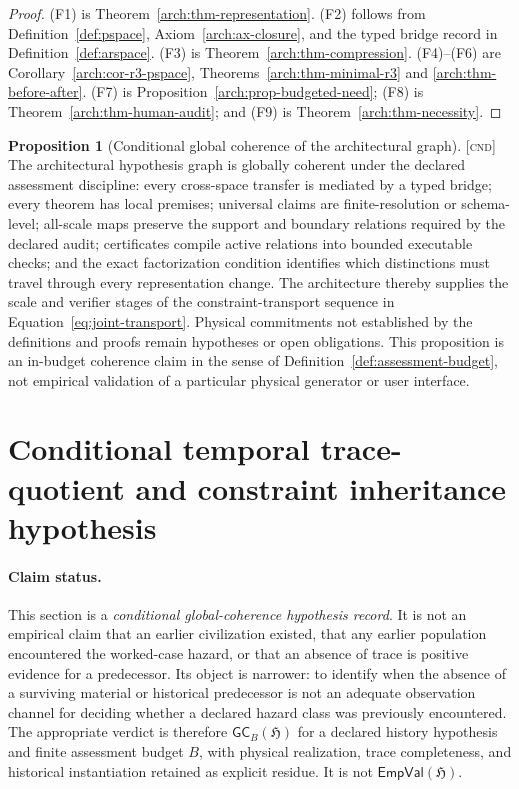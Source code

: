 \documentclass[11pt]{article}
\newcommand{\Cnd}{\textsc{[cnd]}}
\theoremstyle{definition}
\newtheorem{sproposition}{Proposition}
\begin{document}
\begin{proof}
(F1) is Theorem~\ref{arch:thm-representation}. (F2) follows from
Definition~\ref{def:pspace}, Axiom~\ref{arch:ax-closure}, and the typed bridge
record in Definition~\ref{def:arspace}. (F3) is Theorem~\ref{arch:thm-compression}.
(F4)--(F6) are Corollary~\ref{arch:cor-r3-pspace},
Theorems~\ref{arch:thm-minimal-r3} and \ref{arch:thm-before-after}. (F7) is
Proposition~\ref{arch:prop-budgeted-need}; (F8) is
Theorem~\ref{arch:thm-human-audit}; and (F9) is
Theorem~\ref{arch:thm-necessity}.
\end{proof}

\begin{sproposition}[Conditional global coherence of the architectural graph]
\label{arch:prop-global-coherence}
\Cnd{} The architectural hypothesis graph is globally coherent under the declared
assessment discipline: every cross-space transfer is mediated by a typed bridge;
every theorem has local premises; universal claims are finite-resolution or
schema-level; all-scale maps preserve the support and boundary relations required
by the declared audit; certificates compile active relations into bounded executable
checks; and the exact factorization condition identifies which distinctions must
travel through every representation change. The architecture thereby supplies the
scale and verifier stages of the constraint-transport sequence in
Equation~\eqref{eq:joint-transport}. Physical commitments not established by the
definitions and proofs remain hypotheses or open obligations. This proposition is
an in-budget coherence claim in the sense of
Definition~\ref{def:assessment-budget}, not empirical validation of a particular
physical generator or user interface.
\end{sproposition}



\section{Conditional temporal trace-quotient and constraint inheritance hypothesis}
\label{supp:inheritance}

\paragraph{Claim status.}
This section is a \emph{conditional global-coherence hypothesis record}. It is
not an empirical claim that an earlier civilization existed, that any earlier
population encountered the worked-case hazard, or that an absence of trace is
positive evidence for a predecessor. Its object is narrower: to identify when the
absence of a surviving material or historical predecessor is not an adequate
observation channel for deciding whether a declared hazard class was previously
encountered. The appropriate verdict is therefore
$\mathsf{GC}_{B}(\mathfrak H)$ for a declared history hypothesis and finite
assessment budget $B$, with physical realization, trace completeness, and
historical instantiation retained as explicit residue. It is not
$\mathsf{EmpVal}(\mathfrak H)$.
\end{document}
